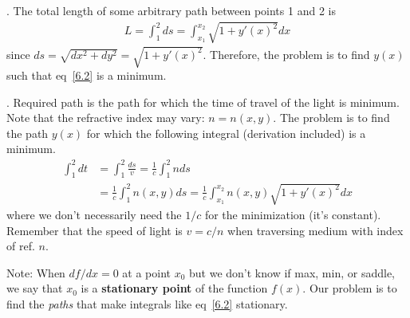 \documentclass[10pt, twocolumn]{article}
\newcommand{\myspace}{\vspace{3\bigskipamount}}
\newcommand\p{\Needspace{10\baselineskip} \noindent}
\newcommand\tlab[1]{\tag{#1}\label{#1}}
\begin{document}
\subsection{}

\p {}. The total length of some arbitrary path between points 1 and 2 is 
\begin{align}
L = \int_1^2 ds = \int_{x_1}^{x_2} \sqrt{1 + y'(x)^2} dx \tlab{6.2}
\end{align}
since $ds = \sqrt{dx^2 + dy^2} = \sqrt{1 + y'(x)^2}$. Therefore, the problem is to find $y(x)$ such that eq~\ref{6.2} is a minimum. 

\myspace 
\p {}. Required path is the path for which the time of travel of the light is minimum. Note that the refractive index may vary: $n = n(x, y)$. The problem is to find the path $y(x)$ for which the following integral (derivation included) is a minimum. 
\begin{align}
	\int_1^2 dt &= \int_1^2 \frac{ds}{v} = \frac{1}{c} \int_1^2 n ds \\
	&= \frac{1}{c} \int_1^2 n(x, y) ds = \frac{1}{c} \int_{x_1}^{x_2} n(x, y) \sqrt{1 + y'(x)^2} dx \tlab{6.3}
\end{align}
where we don't necessarily need the $1/c$ for the minimization (it's constant). Remember that the speed of light is $v = c/n$ when traversing medium with index of ref. $n$. 

\myspace 
\p Note: When $df/dx = 0$ at a point $x_0$ but we don't know if max, min, or saddle, we say that $x_0$ is a \textbf{stationary point} of the function $f(x)$. Our problem is to find the \textit{paths} that make integrals like eq~\ref{6.2} stationary. 

\subsection{}
\end{document}
